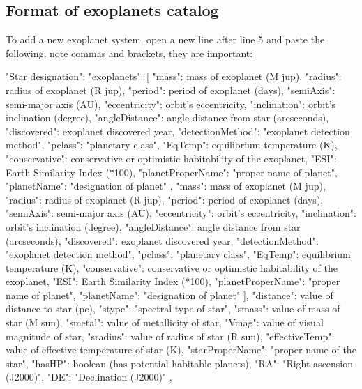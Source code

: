 \subsection{Format of exoplanets catalog}
\label{sec:plugins:Exoplanets:format}

To add a new exoplanet system, open a new line after line 5 and paste the following, note commas and brackets, they are important:

\begin{configfile}[\footnotesize]
"Star designation":
{
   "exoplanets":
   [
   {
      "mass": mass of exoplanet (M jup),
      "radius": radius of exoplanet (R jup),
      "period": period of exoplanet (days),
      "semiAxis": semi-major axis (AU),
      "eccentricity": orbit's eccentricity,
      "inclination": orbit's inclination (degree),
      "angleDistance": angle distance from star (arcseconds),
      "discovered": exoplanet discovered year,
      "detectionMethod": "exoplanet detection method",
      "pclass": "planetary class",
      "EqTemp": equilibrium temperature (K),
      "conservative": conservative or optimistic 
      		habitability of the exoplanet,
      "ESI": Earth Similarity Index (*100),
      "planetProperName": "proper name of planet",
      "planetName": "designation of planet"
   },
   {
      "mass": mass of exoplanet (M jup),
      "radius": radius of exoplanet (R jup),
      "period": period of exoplanet (days),
      "semiAxis": semi-major axis (AU),
      "eccentricity": orbit's eccentricity,
      "inclination": orbit's inclination (degree),
      "angleDistance": angle distance from star (arcseconds),
      "discovered": exoplanet discovered year,
      "detectionMethod": "exoplanet detection method",
      "pclass": "planetary class",
      "EqTemp": equilibrium temperature (K),
      "conservative": conservative or optimistic habitability of the 
                      exoplanet,
      "ESI": Earth Similarity Index (*100),
      "planetProperName": "proper name of planet",
      "planetName": "designation of planet"
   }
   ],
   "distance": value of distance to star (pc),
   "stype": "spectral type of star",
   "smass": value of mass of star (M sun),
   "smetal": value of metallicity of star,
   "Vmag": value of visual magnitude of star,
   "sradius": value of radius of star (R sun),
   "effectiveTemp": value of effective temperature of star (K),
   "starProperName": "proper name of the star",
   "hasHP": boolean (has potential habitable planets),
   "RA": "Right ascension (J2000)",
   "DE": "Declination (J2000)"
},
\end{configfile}

